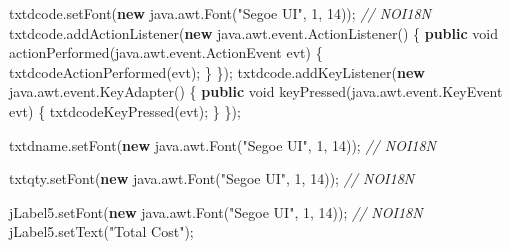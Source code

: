 \documentclass[
  10pt,
]{article}
\newenvironment{Shaded}{}{}
\newcommand{\CommentTok}[1]{\textcolor[rgb]{0.38,0.63,0.69}{\textit{#1}}}
\newcommand{\DataTypeTok}[1]{\textcolor[rgb]{0.56,0.13,0.00}{#1}}
\newcommand{\DecValTok}[1]{\textcolor[rgb]{0.25,0.63,0.44}{#1}}
\newcommand{\FunctionTok}[1]{\textcolor[rgb]{0.02,0.16,0.49}{#1}}
\newcommand{\KeywordTok}[1]{\textcolor[rgb]{0.00,0.44,0.13}{\textbf{#1}}}
\newcommand{\NormalTok}[1]{#1}
\newcommand{\OperatorTok}[1]{\textcolor[rgb]{0.40,0.40,0.40}{#1}}
\newcommand{\StringTok}[1]{\textcolor[rgb]{0.25,0.44,0.63}{#1}}
\begin{document}
\begin{Shaded}
\begin{Highlighting}[numbers=left,,]
\NormalTok{        txtdcode}\OperatorTok{.}\FunctionTok{setFont}\OperatorTok{(}\KeywordTok{new}\NormalTok{ java}\OperatorTok{.}\FunctionTok{awt}\OperatorTok{.}\FunctionTok{Font}\OperatorTok{(}\StringTok{"Segoe UI"}\OperatorTok{,} \DecValTok{1}\OperatorTok{,} \DecValTok{14}\OperatorTok{));} \CommentTok{// NOI18N}
\NormalTok{        txtdcode}\OperatorTok{.}\FunctionTok{addActionListener}\OperatorTok{(}\KeywordTok{new}\NormalTok{ java}\OperatorTok{.}\FunctionTok{awt}\OperatorTok{.}\FunctionTok{event}\OperatorTok{.}\FunctionTok{ActionListener}\OperatorTok{()} \OperatorTok{\{}
            \KeywordTok{public} \DataTypeTok{void} \FunctionTok{actionPerformed}\OperatorTok{(}\NormalTok{java}\OperatorTok{.}\FunctionTok{awt}\OperatorTok{.}\FunctionTok{event}\OperatorTok{.}\FunctionTok{ActionEvent}\NormalTok{ evt}\OperatorTok{)} \OperatorTok{\{}
                \FunctionTok{txtdcodeActionPerformed}\OperatorTok{(}\NormalTok{evt}\OperatorTok{);}
            \OperatorTok{\}}
        \OperatorTok{\});}
\NormalTok{        txtdcode}\OperatorTok{.}\FunctionTok{addKeyListener}\OperatorTok{(}\KeywordTok{new}\NormalTok{ java}\OperatorTok{.}\FunctionTok{awt}\OperatorTok{.}\FunctionTok{event}\OperatorTok{.}\FunctionTok{KeyAdapter}\OperatorTok{()} \OperatorTok{\{}
            \KeywordTok{public} \DataTypeTok{void} \FunctionTok{keyPressed}\OperatorTok{(}\NormalTok{java}\OperatorTok{.}\FunctionTok{awt}\OperatorTok{.}\FunctionTok{event}\OperatorTok{.}\FunctionTok{KeyEvent}\NormalTok{ evt}\OperatorTok{)} \OperatorTok{\{}
                \FunctionTok{txtdcodeKeyPressed}\OperatorTok{(}\NormalTok{evt}\OperatorTok{);}
            \OperatorTok{\}}
        \OperatorTok{\});}

\NormalTok{        txtdname}\OperatorTok{.}\FunctionTok{setFont}\OperatorTok{(}\KeywordTok{new}\NormalTok{ java}\OperatorTok{.}\FunctionTok{awt}\OperatorTok{.}\FunctionTok{Font}\OperatorTok{(}\StringTok{"Segoe UI"}\OperatorTok{,} \DecValTok{1}\OperatorTok{,} \DecValTok{14}\OperatorTok{));} \CommentTok{// NOI18N}

\NormalTok{        txtqty}\OperatorTok{.}\FunctionTok{setFont}\OperatorTok{(}\KeywordTok{new}\NormalTok{ java}\OperatorTok{.}\FunctionTok{awt}\OperatorTok{.}\FunctionTok{Font}\OperatorTok{(}\StringTok{"Segoe UI"}\OperatorTok{,} \DecValTok{1}\OperatorTok{,} \DecValTok{14}\OperatorTok{));} \CommentTok{// NOI18N}

\NormalTok{        jLabel5}\OperatorTok{.}\FunctionTok{setFont}\OperatorTok{(}\KeywordTok{new}\NormalTok{ java}\OperatorTok{.}\FunctionTok{awt}\OperatorTok{.}\FunctionTok{Font}\OperatorTok{(}\StringTok{"Segoe UI"}\OperatorTok{,} \DecValTok{1}\OperatorTok{,} \DecValTok{14}\OperatorTok{));} \CommentTok{// NOI18N}
\NormalTok{        jLabel5}\OperatorTok{.}\FunctionTok{setText}\OperatorTok{(}\StringTok{"Total Cost"}\OperatorTok{);}


\end{Highlighting}
\end{Shaded}
\end{document}
